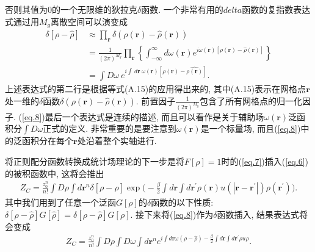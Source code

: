 否则其值为0的一个无限维的狄拉克$\delta$函数.
一个非常有用的$delta$函数的复指数表达式通过用$M_g$离散空间可以演变成
\label{subsec.equations}
   \begin{equation}
       \begin{aligned}
           \delta[\rho-\hat{\rho}] &\approx\prod_{\bm{r}} \delta(\rho(\bm{r})-\hat{\rho}(\bm{r}))
           \\&=\frac{1}{(2\pi)^{M_g}}\prod_{\bm{r}}\left\{
               \int_{-\infty}^{\infty}
               d\omega(\bm{r})e^{i\omega(\bm{r})[\rho(\bm{r})-\hat{\rho}(\bm{r})]}
               \right\}
           \\&=\int D\omega\ e^{i\int\ d\bm{r}\ 
           \omega(\bm{r})[\rho(\bm{r})-\hat{\rho(\bm{r})}]}.
         \end{aligned}
       \label{eq.8}
    \end{equation}
上述表达式的第二行是根据等式(A.15)的应用得出来的,
其中(A.15)表示在网格点$\bm{r}$处一维的$\delta$函数$\delta(\rho(\bm{r})-\hat{\rho}(\bm{r}))$.
前置因子$\frac{1}{(2\pi)^{M_g}}$包含了所有网格点的归一化因子.
(\ref{eq.8})最后一个表达式是连续的描述,
而且可以看作是关于辅助场$\omega(\bm{r})$泛函积分$\int D\omega$正式的定义.
非常重要的是要注意到$\omega(\bm{r})$是一个标量场,
而且(\ref{eq.8})中的泛函积分在每个$\bm{r}$处沿着整个实轴进行.
\par
将正则配分函数转换成统计场理论的下一步是将$F[\rho]=1$时的(\ref{eq.7})插入(\ref{eq.6})的被积函数中,
这将会推出
\label{subsec.equations}
   \begin{equation}
       \begin{aligned}
           Z_C=\frac{z_0^n}{n!} \int D\rho \int d\bm{r}^n \delta[\rho-\hat{\rho}] \exp \big( -\frac{\beta}{2}\int d\bm{r}\int
           d\bm{r^{'}}\rho(\bm{r})u(|\bm{r}-\bm{r^{'}}|)\rho(\bm{r^{'}})
           \big).
     \end{aligned}
       \label{eq.9}
    \end{equation}
其中我们用到了任意一个泛函$G[\rho]$的$\delta$函数的以下性质:
$\delta[\rho-\hat{\rho}]G[\hat{\rho}]=\delta[\rho-\hat{\rho}]G[\rho]$.
接下来将(\ref{eq.8})作为$\delta$函数插入, 结果表达式将会变成
\label{subsec.equations}
   \begin{equation}
       \begin{aligned}
           Z_C=\frac{z_0^n}{n!} \int D\rho \int D\omega \int d\bm{r}^n
           e^{i\int d\bm{r}\omega(\rho-\hat{\rho}) -\frac{\beta}{2}\int d\bm{r}\int
           d\bm{r^{'}}\rho u\rho}.
     \end{aligned}
       \label{eq.10}
    \end{equation}
